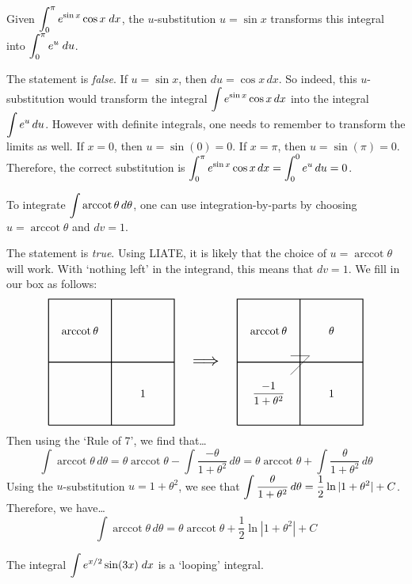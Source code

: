 \documentclass[11pt,letterpaper]{article}
\DeclareMathOperator{\arccot}{arccot}
\newcommand{\boxseven}[4]{%
	\draw[thick] (0,0) -- (4,0) -- (4,4) -- (0,4) -- (0,0);
	\draw[thick] (0,2) -- (4,2);
	\draw[thick] (2,0) -- (2,4);
	\draw (1.7,2.2) -- (2.3,2.2) -- (1.7,1.6);
	\node at (1,3) {$#1$};	%
	\node at (3,1) {$#2$};	%
	\node at (1,1) {$#3$};	%
	\node at (3,3) {$#4$};	%
}
\begin{document}
\thispagestyle{title}

 Given $\displaystyle\int_0^\pi e^{\sin x} \cos x \;dx$, the $u$-substitution $u= \sin x$ transforms this integral into $\displaystyle\int_0^\pi e^u \;du$. \pspace

\sol The statement is \textit{false}. If $u= \sin x$, then $du= \cos x \,dx$. So indeed, this $u$-substitution would transform the integral $\displaystyle\int e^{\sin x} \cos x \,dx$ into the integral $\displaystyle\int e^u \,du$. However with definite integrals, one needs to remember to transform the limits as well. If $x= 0$, then $u= \sin(0)= 0$. If $x= \pi$, then $u= \sin(\pi)= 0$. Therefore, the correct substitution is $\displaystyle\int_0^\pi e^{\sin x} \cos x \,dx= \int_0^0 e^u \,du= 0$. \pvspace{1.3cm}



 To integrate $\ds\int \arccot \theta \,d\theta$, one can use integration-by-parts by choosing $u= \arccot \theta$ and $dv= 1$. \pspace

\sol The statement is \textit{true}. Using LIATE, it is likely that the choice of $u= \arccot \theta$ will work. With `nothing left' in the integrand, this means that $dv= 1$. We fill in our box as follows:
	\[
	\begin{tikzpicture}
	\draw[thick] (0,0) -- (4,0) -- (4,4) -- (0,4) -- (0,0);
	\draw[thick] (0,2) -- (4,2);
	\draw[thick] (2,0) -- (2,4);
	\node at (1,3) {$\arccot \theta$};	%
	\node at (3,1) {$1$};				%
	
	\tikzset{shift={(3,0)}}
	
	\node at (2,2) {\scalebox{1.5}{$\Longrightarrow$}};
	
	\tikzset{shift={(3,0)}}
	
	\boxseven{\arccot \theta}{1}{\dfrac{-1}{1 + \theta^2}}{\theta}
	\end{tikzpicture}
	\]
Then using the `Rule of 7', we find that\dots
	\[
	\int \arccot \theta \,d\theta= \theta \arccot \theta - \int \dfrac{-\theta}{1 + \theta^2} \,d\theta= \theta \arccot \theta + \int \dfrac{\theta}{1 + \theta^2} \,d\theta
	\]
Using the $u$-substitution $u= 1 + \theta^2$, we see that $\displaystyle\int \frac{\theta}{1 + \theta^2} \,d\theta= \frac{1}{2} \ln|1 + \theta^2| + C$. Therefore, we have\dots
	\[
	\int \arccot \theta \,d\theta= \theta \arccot \theta + \dfrac{1}{2} \ln|1 + \theta^2| + C
	\] \pvspace{1.3cm}



 The integral $\displaystyle\int e^{x/2} \sin(3x) \;dx$ is a `looping' integral. \pspace
\end{document}
